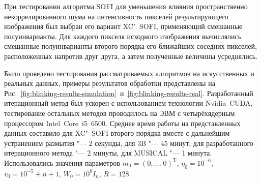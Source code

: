 При тестировании алгоритма SOFI для уменьшения влияния пространственно некоррелированного шума на интенсивность пикселей результирующего изображения был выбран его вариант XC"~SOFI, применяющий смешанные полуинварианты. Для каждого пикселя исходного изображения вычислялись смешанные полуинварианты второго порядка его ближайших соседних пикселей, расположенных напротив друг друга, а затем полученные величины усреднялись.


Было проведено тестирования рассматриваемых алгоритмов на искусственных и реальных данных, примеры результатов обработки представлены на Рис.~\ref{fig:blinking-results-simulation}~и~\ref{fig:blinking-results-real}. Разработанный итерационный метод был ускорен с использованием технологии Nvidia~CUDA, тестирование остальных методов проводилось на ЭВМ с четырёхядерным процессором Intel~Core~i5~6500. Среднее время работы на представленных данных составило для XC"~SOFI второго порядка вместе с дальнейшим устранением размытия "--- 2 секунды, для 3B "--- 45 минут, для разработанного итерационного метода "--- 2 минуты, для MUSICAL "--- 1 минута. Использовались значения параметров $m_0 = \left(0, \ldots,  0\right)^\mathrm{T}$, $\eta_0 = 10^{-6}$, $v_0 = 10^{-5} + n + 1$, $W_0 = 10^8 I_n$, $R=128$.

